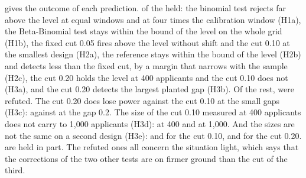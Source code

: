  gives the outcome of each prediction. \HypHeld{} of the \HypTotal{} held: the binomial test rejects far above the level at equal windows and at four times the calibration window (H1a), the Beta-Binomial test stays within the bound of the level on the whole grid (H1b), the fixed cut 0.05 fires above the level without shift and the cut 0.10 at the smallest design (H2a), the reference stays within the bound of the level (H2b) and detects less than the fixed cut, by a margin that narrows with the sample (H2c), the cut 0.20 holds the level at 400 applicants and the cut 0.10 does not (H3a), and the cut 0.20 detects the largest planted gap (H3b). Of the rest, \HypRefuted{} were refuted. The cut 0.20 does lose power against the cut 0.10 at the small gaps (H3c): \SiRateCutTwentySmallB{} against \SiRateCutTenSmallB{} at the gap 0.2. The size of the cut 0.10 measured at 400 applicants does not carry to 1,000 applicants (H3d): \SiRateCutTenSmallZ{} at 400 and \SiRateCutTenLargeZ{} at 1,000. And the sizes are not the same on a second design (H3e): \SiRateCutTenSmallZ{} and \SiInRateCutTenSmallZ{} for the cut 0.10, \SiRateCutTwentySmallZ{} and \SiInRateCutTwentySmallZ{} for the cut 0.20. \HypPartial{} are held in part. The refuted ones all concern the situation light, which says that the corrections of the two other tests are on firmer ground than the cut of the third.
